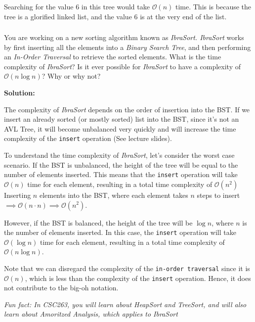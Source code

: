 \documentclass[12pt]{article}
\begin{document}
    Searching for the value $6$ in this tree would take $\mathcal{O}(n)$ time. This is because the tree is a glorified linked list, and the value $6$ is at the very end of the list.

    \clearpage
    \subsubsection{}
    You are working on a new sorting algorithm known as \textit{IbraSort. IbraSort} works by first inserting all the elements into a \textit{Binary Search Tree}, and then performing an \textit{In-Order Traversal} to retrieve the sorted elements. What is the time complexity of \textit{IbraSort}? Is it ever possible for \textit{IbraSort} to have a complexity of $\mathcal{O}(n \log n)$? Why or why not?\\

    \vspace{1cm}

    \textbf{Solution:}

    The complexity of \textit{IbraSort} depends on the order of insertion into the BST. If we insert an already sorted (or mostly sorted) list into the BST, since it's not an AVL Tree, it will become unbalanced very quickly and will increase the time complexity of the \texttt{insert} operation (See lecture slides).

    To understand the time complexity of \textit{IbraSort}, let's consider the worst case scenario. If the BST is unbalanced, the height of the tree will be equal to the number of elements inserted. This means that the \texttt{insert} operation will take $\mathcal{O}(n)$ time for each element, resulting in a total time complexity of $\mathcal{O}(n^2)$ Inserting $n$ elements into the BST, where each element takes $n$ steps to insert $\implies \mathcal{O}(n \cdot n) \implies \mathcal{O}(n^2)$.

    However, if the BST is balanced, the height of the tree will be $\log n$, where $n$ is the number of elements inserted. In this case, the \texttt{insert} operation will take $\mathcal{O}(\log n)$ time for each element, resulting in a total time complexity of $\mathcal{O}(n \log n)$.
    
    Note that we can disregard the complexity of the \texttt{in-order traversal} since it is $\mathcal{O}(n)$, which is less than the complexity of the \texttt{insert} operation. Hence, it does not contribute to the big-oh notation.

    \textit{Fun fact: In CSC263, you will learn about HeapSort and TreeSort, and will also learn about Amoritzed Analysis, which applies to IbraSort}
\end{document}
